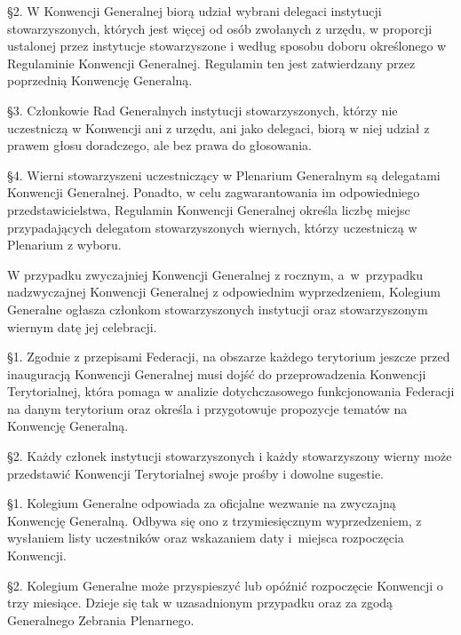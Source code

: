 \S{}2. W Konwencji Generalnej biorą udział wybrani delegaci instytucji stowarzyszonych, których jest więcej od osób zwołanych z urzędu, w proporcji ustalonej przez instytucje stowarzyszone i według sposobu doboru określonego w Regulaminie Konwencji Generalnej. Regulamin ten jest zatwierdzany przez poprzednią Konwencję Generalną.


\S{}3. Członkowie Rad Generalnych instytucji stowarzyszonych, którzy nie uczestniczą w Konwencji ani z urzędu, ani jako delegaci, biorą w niej udział z prawem głosu doradczego, ale bez prawa do głosowania.


\S{}4. Wierni stowarzyszeni uczestniczący w Plenarium Generalnym są delegatami Konwencji Generalnej. Ponadto, w celu zagwarantowania im odpowiedniego  przedstawicielstwa, Regulamin Konwencji Generalnej określa liczbę miejsc przypadających delegatom stowarzyszonych wiernych, którzy uczestniczą w Plenarium z wyboru.
 


 W przypadku zwyczajniej Konwencji Generalnej z rocznym, \mbox{a w przypadku} nadzwyczajnej Konwencji Generalnej z odpowiednim wyprzedzeniem, Kolegium Generalne ogłasza członkom stowarzyszonych instytucji oraz stowarzyszonym wiernym datę jej celebracji.












 \S{}1. Zgodnie z przepisami Federacji, na obszarze każdego terytorium jeszcze przed inauguracją Konwencji Generalnej musi dojść do przeprowadzenia Konwencji Terytorialnej, która pomaga w analizie dotychczasowego funkcjonowania Federacji na danym terytorium oraz określa i przygotowuje propozycje tematów na Konwencję Generalną.


\S{}2. Każdy członek instytucji stowarzyszonych i każdy stowarzyszony wierny może przedstawić Konwencji Terytorialnej swoje prośby i dowolne sugestie.
 


 \S{}1.  Kolegium Generalne odpowiada za oficjalne wezwanie na zwyczajną Konwencję Generalną. Odbywa się ono z trzymiesięcznym wyprzedzeniem, z wysłaniem listy uczestników oraz wskazaniem daty \mbox{i miejsca} rozpoczęcia Konwencji.


\S{}2. Kolegium Generalne może przyspieszyć lub opóźnić rozpoczęcie Konwencji o trzy miesiące. Dzieje się tak w uzasadnionym przypadku oraz za zgodą Generalnego Zebrania Plenarnego.
 
